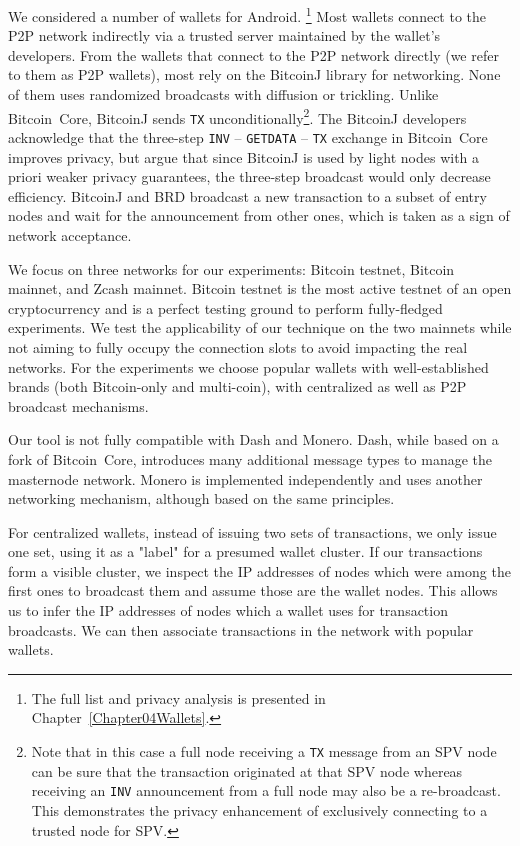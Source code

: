 We considered a number of wallets for Android.
\footnote{The full list and privacy analysis is presented in Chapter~\ref{Chapter04Wallets}.}
Most wallets connect to the P2P network indirectly via a trusted server maintained by the wallet's developers.
From the wallets that connect to the P2P network directly (we refer to them as P2P wallets), most rely on the BitcoinJ library for networking.
None of them uses randomized broadcasts with diffusion or trickling.
Unlike Bitcoin~Core, BitcoinJ sends \texttt{TX} unconditionally\footnote{Note that in this case a full node receiving a \texttt{TX} message from an SPV node can be sure that the transaction originated at that SPV node whereas receiving an \texttt{INV} announcement from a full node may also be a re-broadcast. This demonstrates the privacy enhancement of exclusively connecting to a trusted node for SPV.}.
The BitcoinJ developers acknowledge that the three-step \texttt{INV} -- \texttt{GETDATA} -- \texttt{TX} exchange in Bitcoin~Core improves privacy, but argue that since BitcoinJ is used by light nodes with a priori weaker privacy guarantees, the three-step broadcast would only decrease efficiency.
BitcoinJ and BRD broadcast a new transaction to a subset of entry nodes and wait for the announcement from other ones, which is taken as a sign of network acceptance.

We focus on three networks for our experiments: Bitcoin testnet, Bitcoin mainnet, and Zcash mainnet.
Bitcoin testnet is the most active testnet of an open cryptocurrency and is a perfect testing ground to perform fully-fledged experiments.
We test the applicability of our technique on the two mainnets while not aiming to fully occupy the connection slots to avoid impacting the real networks.
For the experiments we choose popular wallets with well-established brands (both Bitcoin-only and multi-coin), with centralized as well as P2P broadcast mechanisms.

Our tool is not fully compatible with Dash and Monero.
Dash, while based on a fork of Bitcoin~Core, introduces many additional message types to manage the masternode network.
Monero is implemented independently and uses another networking mechanism, although based on the same principles.

For centralized wallets, instead of issuing two sets of transactions, we only issue one set, using it as a "label" for a presumed wallet cluster.
If our transactions form a visible cluster, we inspect the IP addresses of nodes which were among the first ones to broadcast them and assume those are the wallet nodes.
This allows us to infer the IP addresses of nodes which a wallet uses for transaction broadcasts.
We can then associate transactions in the network with popular wallets.

